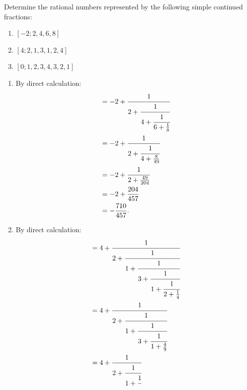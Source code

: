 \begin{exercise}
    Determine the rational numbers represented by the following simple continued fractions:
    \begin{enumerate}
        \item $[-2;2,4,6,8]$
        \item $[4;2,1,3,1,2,4]$
        \item $[0;1,2,3,4,3,2,1]$ \\
    \end{enumerate}
\end{exercise}

\begin{solution}
    \begin{enumerate}
        \item By direct calculation:
        \begin{align*}
            [-2;2,4,6,8] &= 
            -2 + \cfrac{1}{
                2 + \cfrac{1}{
                    4 + \cfrac{1}{
                        6 + \frac{1}{8}
                    }
                }
            } \\
            &= 
            -2 + \cfrac{1}{
                2 + \cfrac{1}{
                    4 + \frac{8}{49}
                }
            } \\
            &= 
            -2 + \cfrac{1}{
                2 + \frac{49}{204}
            } \\
            &= -2 + \frac{204}{457} \\
            &= -\frac{710}{457}.
        \end{align*}
        \item By direct calculation:
        \begin{align*}
            [4;2,1,3,1,2,4] &=
            4 + \cfrac{1}{
                2 + \cfrac{1}{
                    1 + \cfrac{1}{
                        3 + \cfrac{1}{
                            1 + \cfrac{1}{
                                2 + \frac{1}{4}
                            }
                        }
                    }
                }
            } \\
            &=
            4 + \cfrac{1}{
                2 + \cfrac{1}{
                    1 + \cfrac{1}{
                        3 + \cfrac{1}{
                            1 + \frac{4}{9}
                        }
                    }
                }
            } \\
            &=
            4 + \cfrac{1}{
                2 + \cfrac{1}{
                    1 + \cfrac{1}{
}}}
\end{align*}
\end{enumerate}
\end{solution}
